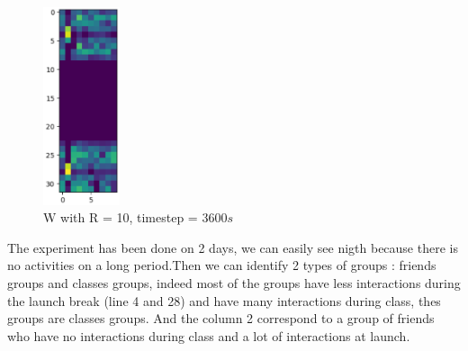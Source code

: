 \documentclass{article}
\begin{document}
\begin{figure}[H]
    \centering
    \includegraphics[width=0.2\textwidth]{images/W_R=10_t=3600.png}
    \caption{W with R = 10, timestep = 3600$s$}
\end{figure}

The experiment has been done on 2 days, we can easily see nigth because there is no activities on a long period.Then we can identify
2 types of groups : friends groups and classes groups, indeed  most of the groups have less interactions during the launch break (line 4 and 28)
and have many interactions during class, thes groups are classes groups. And the column 2 correspond to a group of friends who have
no interactions during class and a lot of interactions at launch.
\end{document}

